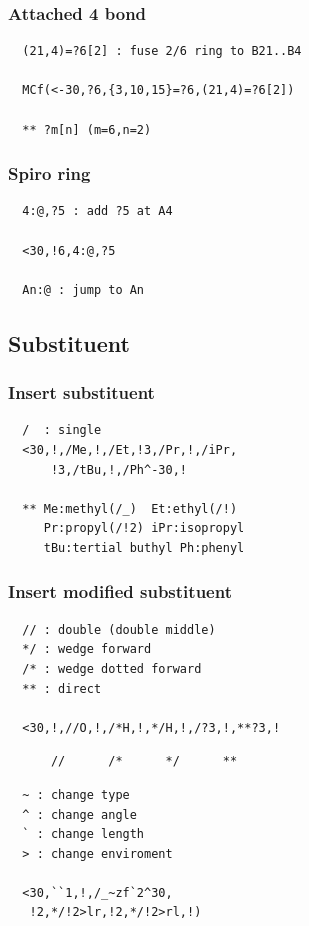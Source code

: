 \documentclass[a4paper]{article}
\makeatletter
\def\MCFstructure{\hspace{5mm}{\@strufont\char\fontnum}\advance\fontnum\@ne\relax}%
\makeatother
\begin{document}
\subsubsection{Attached 4 bond}
\begin{verbatim}
  (21,4)=?6[2] : fuse 2/6 ring to B21..B4

  MCf(<-30,?6,{3,10,15}=?6,(21,4)=?6[2])

  ** ?m[n] (m=6,n=2)
\end{verbatim}
\MCFstructure
\subsubsection{Spiro ring}
\begin{verbatim}
  4:@,?5 : add ?5 at A4

  <30,!6,4:@,?5

  An:@ : jump to An
\end{verbatim}
\MCFstructure
\subsection{Substituent}
\subsubsection{Insert substituent}
\begin{verbatim}
  /  : single
  <30,!,/Me,!,/Et,!3,/Pr,!,/iPr,
      !3,/tBu,!,/Ph^-30,!

  ** Me:methyl(/_)  Et:ethyl(/!)
     Pr:propyl(/!2) iPr:isopropyl
     tBu:tertial buthyl Ph:phenyl
\end{verbatim}
\MCFstructure
\subsubsection{Insert modified substituent}
\begin{verbatim}
  // : double (double middle)
  */ : wedge forward
  /* : wedge dotted forward
  ** : direct

  <30,!,//O,!,/*H,!,*/H,!,/?3,!,**?3,!
\end{verbatim}
\MCFstructure
\vspace{-3mm}%
\begin{verbatim}
      //      /*      */      **
\end{verbatim}
\begin{verbatim}
  ~ : change type
  ^ : change angle
  ` : change length
  > : change enviroment

  <30,``1,!,/_~zf`2^30,
   !2,*/!2>lr,!2,*/!2>rl,!)
\end{verbatim}
\MCFstructure
\end{document}
